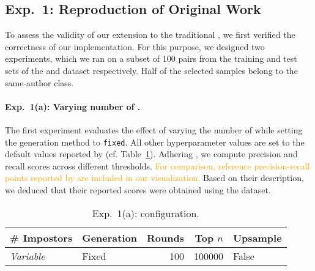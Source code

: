 \subsection{Exp.\ 1: Reproduction of Original Work}

To assess the validity of our extension to the traditional \impAppr{}, we first verified the correctness of our implementation. 
For this purpose, we designed two experiments, which we ran on a subset of 100 pairs from the training and test sets of the \dataBlog{} and \dataStudent{} dataset respectively. 
Half of the selected samples belong to the same-author class.

\paragraph{Exp.\ 1(a): Varying number of \imps{}.}
The first experiment evaluates the effect of varying the number of \imps{} while setting the \imp{} generation method to \texttt{fixed}.
All other hyperparameter values are set to the default values reported by \citet{koppel_determining_2014} (cf. Table~\ref{tab:repr_exp1}). 
Adhering \citet{koppel_determining_2014}, we compute precision and recall scores across different thresholds.
\textcolor{orange}{For comparison, reference precision-recall points reported by \citet{koppel_determining_2014} are included in our visualization.} 
Based on their description, we deduced that their reported scores were obtained using the \dataBlog{} dataset.


\begin{table}[h]
\centering\small
\caption{Exp.\ 1(a): \impAppr{} configuration.}
\label{tab:repr_exp1}
\begin{tabular}{@{}llrrl@{}}   %
\toprule
\# Impostors & Generation & Rounds & Top $n$ & Upsample \\
\midrule
\textit{Variable} & Fixed & 100 & \num{100000} & False \\
\bottomrule
\end{tabular}%
\end{table}



